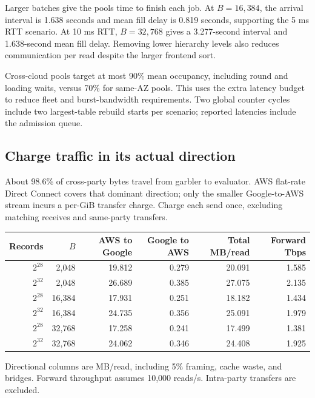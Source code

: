 \documentclass[11pt]{article}
\begin{document}
Larger batches give the pools time to finish each job. At $B=16{,}384$,
the arrival interval is 1.638 seconds and mean fill delay is 0.819 seconds,
supporting the 5 ms RTT scenario. At 10 ms RTT, $B=32{,}768$ gives a
3.277-second interval and 1.638-second mean fill delay. Removing lower
hierarchy levels also reduces communication per read despite the larger
frontend sort.

Cross-cloud pools target at most 90\% mean occupancy, including round and
loading waits, versus 70\% for same-AZ pools. This uses the extra latency
budget to reduce fleet and burst-bandwidth requirements. Two global
counter cycles include two largest-table rebuild starts per scenario;
reported latencies include the admission queue.

\subsection{Charge traffic in its actual direction}
About 98.6\% of cross-party bytes travel from garbler to evaluator.
AWS flat-rate Direct Connect covers that dominant direction; only the
smaller Google-to-AWS stream incurs a per-GiB transfer charge. Charge each
send once, excluding matching receives and same-party transfers.

\begin{center}\footnotesize
\begin{tabular}{rrrrrr}\toprule
Records & $B$ & AWS to Google & Google to AWS & Total MB/read & Forward Tbps\\\midrule
$2^{28}$ & 2,048 & 19.812 & 0.279 & 20.091 & 1.585\\
$2^{32}$ & 2,048 & 26.689 & 0.385 & 27.075 & 2.135\\
$2^{28}$ & 16,384 & 17.931 & 0.251 & 18.182 & 1.434\\
$2^{32}$ & 16,384 & 24.735 & 0.356 & 25.091 & 1.979\\
$2^{28}$ & 32,768 & 17.258 & 0.241 & 17.499 & 1.381\\
$2^{32}$ & 32,768 & 24.062 & 0.346 & 24.408 & 1.925\\
\bottomrule\end{tabular}\end{center}
{\footnotesize Directional columns are MB/read, including 5\% framing, cache waste, and bridges. Forward throughput assumes 10,000 reads/s. Intra-party transfers are excluded.\par}

\clearpage
\end{document}

